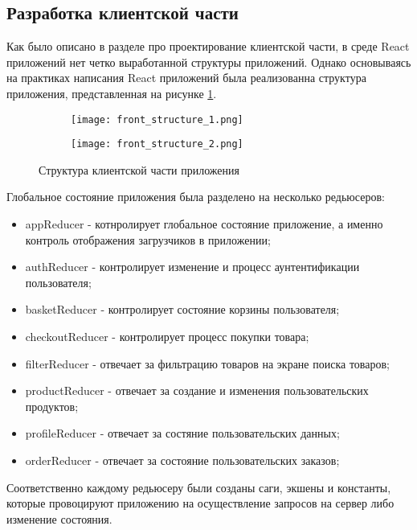 \subsection{Разработка клиентской части}

Как было описано в разделе про проектирование клиентской части, в среде React приложений нет четко выработанной структуры приложений.
Однако основываясь на практиках написания React приложений была реализованна структура приложения, представленная на рисунке \ref{front:struct}.

\begin{figure}[!h]
    \begin{subfigure}[b]{0.45\textwidth}
    \centering
    \texttt{[image: front\_structure\_1.png]}
    \caption{}
    \end{subfigure}
    \begin{subfigure}[b]{0.3\textwidth}
    \centering
    \texttt{[image: front\_structure\_2.png]}
    \caption{}
    \end{subfigure}
    \caption{ Структура клиентской части приложения }
    \label{front:struct}
\end{figure}

Глобальное состояние приложения была разделено на несколько редьюсеров:
\begin{itemize}
    \item appReducer - котнролирует глобальное состояние приложение, а именно контроль отображения загрузчиков в приложении;
    \item authReducer - контролирует изменение и процесс аунтентификации пользователя;
    \item basketReducer - контролирует состояние корзины пользователя;
    \item checkoutReducer - контролирует процесс покупки товара;
    \item filterReducer - отвечает за фильтрацию товаров на экране поиска товаров;
    \item productReducer - отвечает за создание и изменения пользовательских продуктов;
    \item profileReducer - отвечает за состяние пользовательских данных;
    \item orderReducer - отвечает за состояние пользовательских заказов;
\end{itemize}

Соответственно каждому редьюсеру были созданы саги, экшены и константы, которые провоцируют приложению на осуществление запросов на сервер либо изменение состояния.

